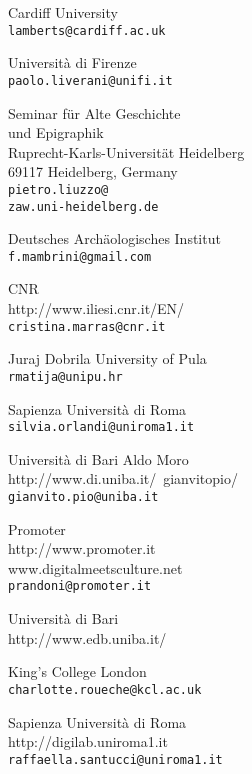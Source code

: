 \begin{contributors}
{   Cardiff University\\
\texttt{lamberts@cardiff.ac.uk}
}


{  Università di Firenze \\
\texttt{paolo.liverani@unifi.it}
}

{Seminar für Alte Geschichte\\ und Epigraphik\\
Ruprecht-Karls-Universität Heidelberg\\
69117 Heidelberg, Germany\\
\texttt{pietro.liuzzo@\\zaw.uni-heidelberg.de}}


{Deutsches Archäologisches Institut \\
\texttt{f.mambrini@gmail.com}
}


{CNR  \\
{ http://www.iliesi.cnr.it/EN/}	\\
\texttt{cristina.marras@cnr.it		}
}
	

{  Juraj Dobrila University of Pula	 \\
\texttt{rmatija@unipu.hr}
}

{  Sapienza Università di Roma	 \\
\texttt{silvia.orlandi@uniroma1.it}
}
	
			

{ Università di Bari Aldo Moro	  \\
{http://www.di.uniba.it/~gianvitopio/ }\\
\texttt{gianvito.pio@uniba.it}
}

{ Promoter	  \\
{http://www.promoter.it} \\
{ www.digitalmeetsculture.net}	\\
\texttt{prandoni@promoter.it}
}



{  Università di Bari	 \\
{http://www.edb.uniba.it/}
}
			

{ King's College London	  \\
\texttt{charlotte.roueche@kcl.ac.uk	}
}
	

{ Sapienza Università di Roma  \\
{http://digilab.uniroma1.it }\\
\texttt{raffaella.santucci@uniroma1.it	}
}



\end{contributors}
